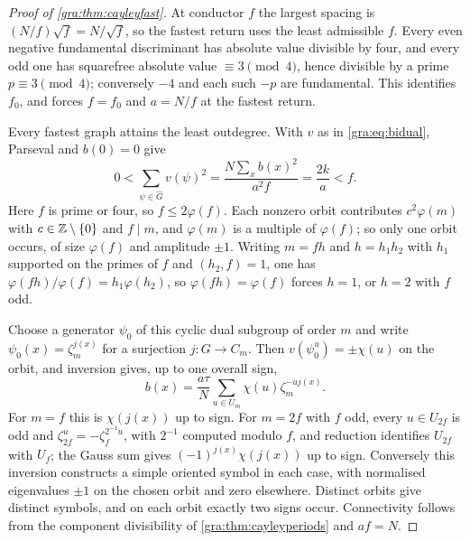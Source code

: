 \begin{proof}[Proof of \cref{gra:thm:cayleyfast}]
At conductor $f$ the largest spacing is $(N/f)\sqrt f=N/\sqrt f$, so the
fastest return uses the least admissible $f$. Every even negative
fundamental discriminant has absolute value divisible by four, and every
odd one has squarefree absolute value $\equiv3\pmod4$, hence divisible by a
prime $p\equiv3\pmod4$; conversely $-4$ and each such $-p$ are fundamental.
This identifies $f_0$, and forces $f=f_0$ and $a=N/f$ at the fastest
return.

Every fastest graph attains the least outdegree. With $v$ as in
\eqref{gra:eq:bidual}, Parseval and $b(0)=0$ give
\[
 0<\sum_{\psi\in\widehat G}v(\psi)^2=\frac{N\sum_xb(x)^2}{a^2f}=\frac{2k}a<f .
\]
Here $f$ is prime or four, so $f\le2\varphi(f)$. Each nonzero orbit
contributes $c^2\varphi(m)$ with $c\in\mathbb{Z}\setminus\{0\}$ and $f\mid m$, and
$\varphi(m)$ is a multiple of $\varphi(f)$; so only one orbit occurs, of
size $\varphi(f)$ and amplitude $\pm1$. Writing $m=fh$ and $h=h_1h_2$ with
$h_1$ supported on the primes of $f$ and $(h_2,f)=1$, one has
$\varphi(fh)/\varphi(f)=h_1\varphi(h_2)$, so $\varphi(fh)=\varphi(f)$ forces
$h=1$, or $h=2$ with $f$ odd.

Choose a generator $\psi_0$ of this cyclic dual subgroup of order $m$ and
write $\psi_0(x)=\zeta_m^{j(x)}$ for a surjection $j:G\to C_m$. Then
$v(\psi_0^u)=\pm\chi(u)$ on the orbit, and inversion gives, up to one
overall sign,
\[
 b(x)=\frac{a\tau}N\sum_{u\in U_m}\chi(u)\zeta_m^{-uj(x)} .
\]
For $m=f$ this is $\chi(j(x))$ up to sign. For $m=2f$ with $f$ odd, every
$u\in U_{2f}$ is odd and $\zeta_{2f}^u=-\zeta_f^{2^{-1}u}$, with $2^{-1}$
computed modulo $f$, and reduction identifies $U_{2f}$ with $U_f$; the
Gauss sum gives $(-1)^{j(x)}\chi(j(x))$ up to sign. Conversely this
inversion constructs a simple oriented symbol in each case, with normalised
eigenvalues $\pm1$ on the chosen orbit and zero elsewhere. Distinct orbits
give distinct symbols, and on each orbit exactly two signs occur.
Connectivity follows from the component divisibility of
\cref{gra:thm:cayleyperiods} and $af=N$.
\end{proof}

